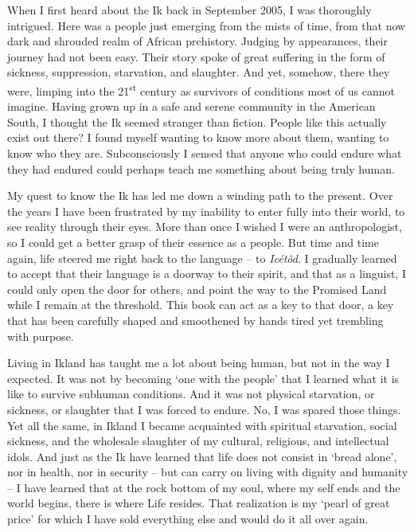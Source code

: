 When I first heard about the Ik back in September 2005, I was thoroughly intrigued. Here was a people just emerging from the mists of time, from that now dark and shrouded realm of African prehistory. Judging by appearances, their journey had not been easy. Their story spoke of great suffering in the form of sickness, suppression, starvation, and slaughter. And yet, somehow, there they were, limping into the 21\textsuperscript{st} century as survivors of conditions most of us cannot imagine. Having grown up in a safe and serene community in the American South, I thought the Ik seemed stranger than fiction. People like this actually exist out there? I found myself wanting to know more about them, wanting to know who they are. Subconsciously I sensed that anyone who could endure what they had endured could perhaps teach me something about being truly human. 

My quest to know the Ik has led me down a winding path to the present. Over the years I have been frustrated by my inability to enter fully into their world, to see reality through their eyes. More than once I wished I were an anthropologist, so I could get a better grasp of their essence as a people. But time and time again, life steered me right back to the language – to \textit{Icétôd}. I gradually learned to accept that their language is a doorway to their spirit, and that as a linguist, I could only open the door for others, and point the way to the Promised Land while I remain at the threshold. This book can act as a key to that door, a key that has been carefully shaped and smoothened by hands tired yet trembling with purpose.

Living in Ikland has taught me a lot about being human, but not in the way I expected. It was not by becoming ‘one with the people’ that I learned what it is like to survive subhuman conditions. And it was not physical starvation, or sickness, or slaughter that I was forced to endure. No, I was spared those things. Yet all the same, in Ikland I became acquainted with spiritual starvation, social sickness, and the wholesale slaughter of my cultural, religious, and intellectual idols. And just as the Ik have learned that life does not consist in ‘bread alone’, nor in health, nor in security – but can carry on living with dignity and humanity – I have learned that at the rock bottom of my soul, where my self ends and the world begins, there is where Life resides. That realization is my ‘pearl of great price’ for which I have sold everything else and would do it all over again. 
